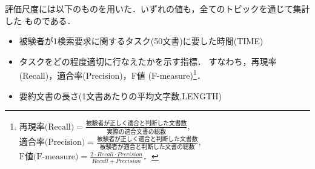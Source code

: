 評価尺度には以下のものを用いた．いずれの値も，全てのトピックを通じて集計した
ものである．
\begin{itemize}
  \item 被験者が1検索要求に関するタスク(50文書)に要した時間(TIME)
  \item タスクをどの程度適切に行なえたかを示す指標．
	すなわち，再現率(Recall)，適合率(Precision)，F値
	(F-measure)\footnote{
	$\mbox{再現率(Recall)} =\frac{\mbox{被験者が正しく適合と判断した文書数}}{\mbox{実際の適合文書の総数}}$,\\
	$\mbox{適合率(Precision)} =\frac{\mbox{被験者が正しく適合と判断した文書数}}{\mbox{被験者が適合と判断した文書の総数}}$,\\
	$\mbox{F値(F-measure)} = \frac{2\cdot Recall\cdot Precision}{Recall + Precision}$．
	}．
  \item 要約文書の長さ(1文書あたりの平均文字数,LENGTH)
\end{itemize}
